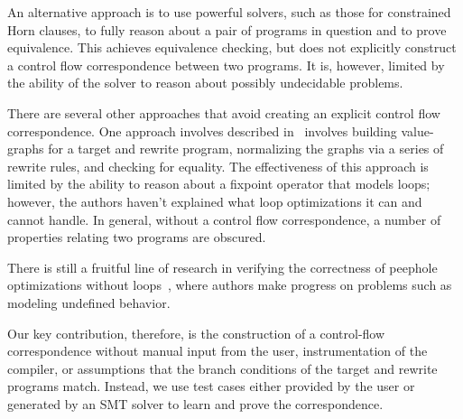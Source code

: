 An alternative approach is to use powerful solvers, such as those for
constrained Horn clauses, to fully reason about a pair of programs in
question and to prove equivalence. This achieves equivalence checking,
but does not explicitly construct a control flow correspondence
between two programs. It is, however, limited by the ability of the
solver to reason about possibly undecidable problems.

There are several other approaches that avoid creating an explicit
control flow correspondence. One approach involves described
in~\cite{Tristan2011} involves building value-graphs for a target and
rewrite program, normalizing the graphs via a series of rewrite rules,
and checking for equality. The effectiveness of this approach is
limited by the ability to reason about a fixpoint operator that models
loops; however, the authors haven't explained what loop optimizations
it can and cannot handle. In general, without a control flow correspondence, a
number of properties relating two programs are obscured.

There is still a fruitful line of research in verifying the
correctness of peephole optimizations without loops~\cite{Lopes2015},
where authors make progress on problems such as modeling undefined
behavior.

Our key contribution, therefore, is the construction of a control-flow
correspondence without manual input from the user, instrumentation
of the compiler, or assumptions that the branch conditions of the
target and rewrite programs match. Instead, we use test cases either
provided by the user or generated by an SMT solver to learn and prove
the correspondence.

